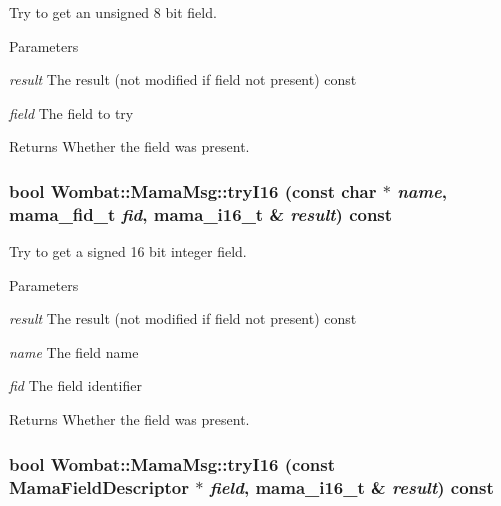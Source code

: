 Try to get an unsigned 8 bit field. 
\begin{DoxyParams}{Parameters}
\item[{\em result}]The result (not modified if field not present) const \item[{\em field}]The field to try \end{DoxyParams}
\begin{DoxyReturn}{Returns}
Whether the field was present. 
\end{DoxyReturn}
\hypertarget{classWombat_1_1MamaMsg_afc5970314030d3deef6d8936478a0dd0}{
\subsubsection[{tryI16}]{\setlength{\rightskip}{0pt plus 5cm}bool Wombat::MamaMsg::tryI16 (const char $\ast$ {\em name}, \/  mama\_\-fid\_\-t {\em fid}, \/  mama\_\-i16\_\-t \& {\em result}) const}}
\label{classWombat_1_1MamaMsg_afc5970314030d3deef6d8936478a0dd0}


Try to get a signed 16 bit integer field. 
\begin{DoxyParams}{Parameters}
\item[{\em result}]The result (not modified if field not present) const \item[{\em name}]The field name \item[{\em fid}]The field identifier \end{DoxyParams}
\begin{DoxyReturn}{Returns}
Whether the field was present. 
\end{DoxyReturn}
\hypertarget{classWombat_1_1MamaMsg_ae1eb886004eef6d6b142829ff60bcc16}{
\subsubsection[{tryI16}]{\setlength{\rightskip}{0pt plus 5cm}bool Wombat::MamaMsg::tryI16 (const {\bf MamaFieldDescriptor} $\ast$ {\em field}, \/  mama\_\-i16\_\-t \& {\em result}) const}}
\label{classWombat_1_1MamaMsg_ae1eb886004eef6d6b142829ff60bcc16}


